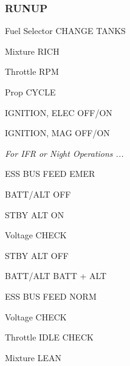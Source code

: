 \begin{multicols}{2}
\subsubsection*{RUNUP}
\begin{enumerate*}
\item Fuel Selector \dotfill CHANGE TANKS
\item Mixture \dotfill RICH
\item Throttle  RPM
\item Prop \dotfill CYCLE
\item IGNITION, ELEC \dotfill OFF/ON
\item IGNITION, MAG \dotfill OFF/ON
\item  \emph{For IFR or Night Operations ...}
\begin{itemize*}
\item ESS BUS FEED \dotfill EMER
\item BATT/ALT \dotfill OFF
\item STBY ALT \dotfill ON
\item Voltage \dotfill CHECK
\item STBY ALT \dotfill OFF
\item BATT/ALT \dotfill BATT + ALT
\item ESS BUS FEED \dotfill NORM
\end{itemize*}
\item Voltage \dotfill CHECK
\item Throttle \dotfill IDLE CHECK
\item Mixture \dotfill LEAN
\end{enumerate*}

\columnbreak %


\end{multicols}

